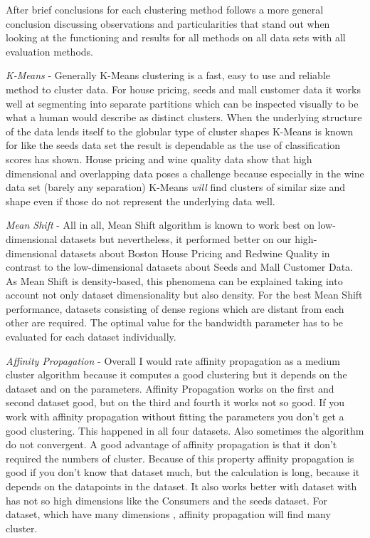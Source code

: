 
After brief conclusions for each clustering method follows a more general conclusion discussing observations and particularities that stand out when looking at the functioning and results for all methods on all data sets with all evaluation methods.

\textit{K-Means} - Generally K-Means clustering is a fast, easy to use and reliable method to cluster data. For house pricing, seeds and mall customer data it works well at segmenting into separate partitions which can be inspected visually to be what a human would describe as distinct clusters. When the underlying structure of the data lends itself to the globular type of cluster shapes K-Means is known for like the seeds data set the result is dependable as the use of classification scores has shown. House pricing and wine quality data show that high dimensional and overlapping data poses a challenge because especially in the wine data set (barely any separation) K-Means \textit{will} find clusters of similar size and shape even if those do not represent the underlying data well.

\textit{Mean Shift} - All in all, Mean Shift algorithm is known to work best on low-dimensional datasets but nevertheless, it performed better on our high-dimensional datasets about Boston House Pricing and Redwine Quality in contrast to the low-dimensional datasets about Seeds and Mall Customer Data. As Mean Shift is density-based, this phenomena can be explained taking into account not only dataset dimensionality but also density. For the best Mean Shift performance, datasets consisting of dense regions which are distant from each other are required. 
The optimal value for the bandwidth parameter has to be evaluated for each dataset individually.

\textit{Affinity Propagation} - Overall I would rate affinity propagation as a medium cluster algorithm because it computes a good clustering but it depends on the dataset and on the parameters. Affinity Propagation works on the first and second dataset good, but on the third and fourth it works not so good. If you work with affinity propagation without fitting the parameters you don’t get a good clustering. This happened in all four datasets. Also sometimes the algorithm do not convergent. A good advantage of affinity propagation is that it don’t required the numbers of cluster. Because of this property affinity propagation is good if you don’t know that dataset much, but the calculation is long, because it depends on the datapoints in the dataset. It also works better with dataset with has not so high dimensions like the Consumers and the seeds dataset. For dataset, which have many dimensions , affinity propagation will find many cluster. \\


